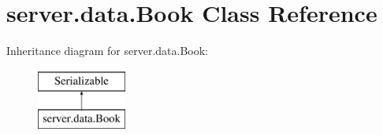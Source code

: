 \hypertarget{classserver_1_1data_1_1_book}{}\section{server.\+data.\+Book Class Reference}
\label{classserver_1_1data_1_1_book}
Inheritance diagram for server.\+data.\+Book\+:\begin{figure}[H]
\begin{center}
\leavevmode
\includegraphics[height=2.000000cm]{classserver_1_1data_1_1_book}
\end{center}
\end{figure}
